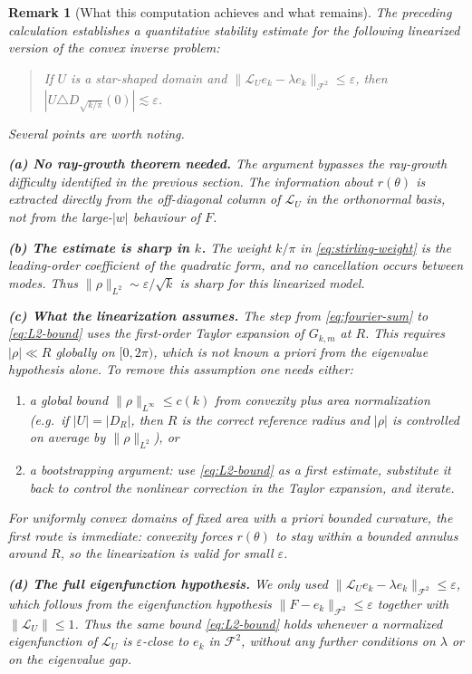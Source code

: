 \documentclass[a4paper,11pt,reqno]{amsart}
\newtheorem{remark}{Remark}[section]
\begin{document}
\begin{remark}[What this computation achieves and what remains]
The preceding calculation establishes a quantitative stability estimate for the
following linearized version of the convex inverse problem:
\begin{quote}
If $U$ is a star-shaped domain and $\|\mathcal{L}_Ue_k-\lambda e_k\|_{\mathcal{F}^2}\le\varepsilon$,
then $|U\triangle D_{\sqrt{k/\pi}}(0)|\lesssim\varepsilon$.
\end{quote}

Several points are worth noting.

\smallskip
\textbf{(a) No ray-growth theorem needed.}
The argument bypasses the ray-growth difficulty identified in the previous section.
The information about $r(\theta)$ is extracted directly from the off-diagonal column
of $\mathcal{L}_U$ in the orthonormal basis, not from the large-$|w|$ behaviour of $F$.

\smallskip
\textbf{(b) The estimate is sharp in $k$.}
The weight $k/\pi$ in \eqref{eq:stirling-weight} is the leading-order coefficient
of the quadratic form, and no cancellation occurs between modes. Thus $\|\rho\|_{L^2}
\sim\varepsilon/\sqrt{k}$ is sharp for this linearized model.

\smallskip
\textbf{(c) What the linearization assumes.}
The step from \eqref{eq:fourier-sum} to \eqref{eq:L2-bound} uses the first-order
Taylor expansion of $G_{k,m}$ at $R$. This requires $|\rho|\ll R$ globally on
$[0,2\pi)$, which is not known a priori from the eigenvalue hypothesis alone.
To remove this assumption one needs either:
\begin{enumerate}
\item a global bound $\|\rho\|_{L^\infty}\le c(k)$ from convexity plus area
normalization (e.g.\ if $|U|=|D_R|$, then $R$ is the correct reference radius
and $|\rho|$ is controlled on average by $\|\rho\|_{L^2}$), or
\item a bootstrapping argument: use \eqref{eq:L2-bound} as a first estimate,
substitute it back to control the nonlinear correction in the Taylor expansion,
and iterate.
\end{enumerate}
For uniformly convex domains of fixed area with a priori bounded curvature, the
first route is immediate: convexity forces $r(\theta)$ to stay within a
bounded annulus around $R$, so the linearization is valid for small $\varepsilon$.

\smallskip
\textbf{(d) The full eigenfunction hypothesis.}
We only used $\|\mathcal{L}_Ue_k-\lambda e_k\|_{\mathcal{F}^2}\le\varepsilon$, which follows
from the eigenfunction hypothesis $\|F-e_k\|_{\mathcal{F}^2}\le\varepsilon$ together
with $\|\mathcal{L}_U\|\le1$.  Thus the same bound
\eqref{eq:L2-bound} holds whenever a normalized eigenfunction of $\mathcal{L}_U$
is $\varepsilon$-close to $e_k$ in $\mathcal{F}^2$, without any further conditions on $\lambda$
or on the eigenvalue gap.


\end{remark}
\end{document}
